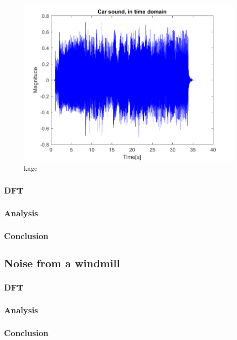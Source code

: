 \begin{figure}
	\includegraphics[width=\textwidth]{code/Car_figure1.png}
	\caption{kage}
	\label{fig:Car_figure1:1}
\end{figure}

\subsubsection{DFT}

\subsubsection{Analysis}

\subsubsection{Conclusion}

\subsection{Noise from a windmill}
\subsubsection{DFT}

\subsubsection{Analysis}

\subsubsection{Conclusion}

